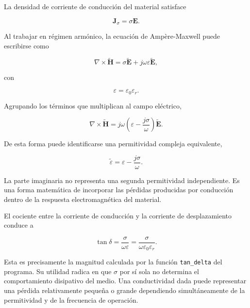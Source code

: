 La densidad de corriente de conducción del material satisface

\begin{equation}
\mathbf{J}_{\sigma}=\sigma\mathbf{E}.
\end{equation}

Al trabajar en régimen armónico, la ecuación de Ampère-Maxwell puede escribirse como

\begin{equation}
\nabla\times\widetilde{\mathbf{H}}
=
\sigma\widetilde{\mathbf{E}}
+
j\omega\varepsilon\widetilde{\mathbf{E}},
\end{equation}

con

\begin{equation}
\varepsilon=\varepsilon_0\varepsilon_r.
\end{equation}

Agrupando los términos que multiplican al campo eléctrico,

\begin{equation}
\nabla\times\widetilde{\mathbf{H}}
=
j\omega
\left(
\varepsilon-\frac{j\sigma}{\omega}
\right)
\widetilde{\mathbf{E}}.
\end{equation}

De esta forma puede identificarse una permitividad compleja equivalente,

\begin{equation}
\widetilde{\varepsilon}
=
\varepsilon-\frac{j\sigma}{\omega}.
\end{equation}

La parte imaginaria no representa una segunda permitividad independiente. Es una forma matemática de incorporar las pérdidas producidas por conducción dentro de la respuesta electromagnética del material.

El cociente entre la corriente de conducción y la corriente de desplazamiento conduce a

\begin{equation}
\tan\delta
=
\frac{\sigma}{\omega\varepsilon}
=
\frac{\sigma}
{\omega\varepsilon_0\varepsilon_r}.
\label{eq:tan_delta_desarrollo}
\end{equation}

Esta es precisamente la magnitud calculada por la función \texttt{tan\_delta} del programa. Su utilidad radica en que $\sigma$ por sí sola no determina el comportamiento disipativo del medio. Una conductividad dada puede representar una pérdida relativamente pequeña o grande dependiendo simultáneamente de la permitividad y de la frecuencia de operación.

